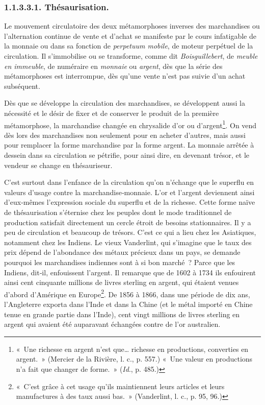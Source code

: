 \documentclass[french,twoside]{book} %
\begin{document}
\subsubsection[{1.1.3.3.1. Thésaurisation.}]{1.1.3.3.1. Thésaurisation.}
\noindent Le mouvement circulatoire des deux métamorphoses inverses des marchandises ou l’alternation continue de vente et d’achat se manifeste par le cours infatigable de la monnaie ou dans sa fonction de \emph{perpetuum mobile}, de moteur perpétuel de la circulation. Il s’immobilise ou se transforme, comme dit \emph{Boisguillebert}, de \emph{meuble en immeuble}, de numéraire en \emph{monnaie} ou\emph{ argent}, dès que la série des métamorphoses est interrompue, dès qu’une vente n’est pas suivie d’un achat subséquent.\par
Dès que se développe la circulation des marchandises, se développent aussi la nécessité et le désir de fixer et de conserver le produit de la première métamorphose, la marchandise changée en chrysalide d’or ou d’argent\footnote{« Une richesse en argent n’est que… richesse en productions, converties en argent. » (Mercier de la Rivière, l. c., p. 557.) « Une valeur en productions n’a fait que changer de forme. » (\emph{Id}., p. 485.)}. On vend dès lors des marchandises non seulement pour en acheter d’autres, mais aussi pour remplacer la forme marchandise par la forme argent. La monnaie arrêtée à dessein dans sa circulation se pétrifie, pour ainsi dire, en devenant trésor, et le vendeur se change en thésauriseur.\par
C’est surtout dans l’enfance de la circulation qu’on n’échange que le superflu en valeurs d’usage contre la marchandise‑monnaie. L’or et l’argent deviennent ainsi d’eux‑mêmes l’expression sociale du superflu et de la richesse. Cette forme naïve de thésaurisation s’éternise chez les peuples dont le mode traditionnel de production satisfait directement un cercle étroit de besoins stationnaires. Il y a peu de circulation et beaucoup de trésors. C’est ce qui a lieu chez les Asiatiques, notamment chez les Indiens. Le vieux Vanderlint, qui s’imagine que le taux des prix dépend de l’abondance des métaux précieux dans un pays, se demande pourquoi les marchandises indiennes sont à si bon marché ? Parce que les Indiens, dit‑il, enfouissent l’argent. Il remarque que de 1602 à 1734 ils enfouirent ainsi cent cinquante millions de livres sterling en argent, qui étaient venues d’abord d’Amérique en Europe\footnote{« C’est grâce à cet usage qu’ils maintiennent leurs articles et leurs manufactures à des taux aussi bas. » (Vanderlint, l. c., p. 95, 96.)}. De 1856 à 1866, dans une période de dix ans, l’Angleterre exporta dans l’Inde et dans la Chine (et le métal importé en Chine tenue en grande partie dans l’Inde), cent vingt millions de livres sterling en argent qui avaient été auparavant échangées contre de l’or australien.\par
\end{document}
